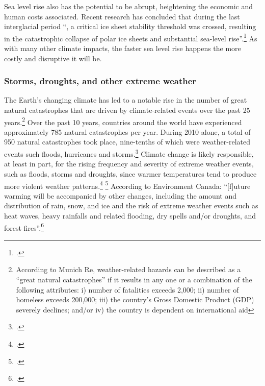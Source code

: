 \documentclass[10pt]{article}
\begin{document}
Sea level rise also has the potential to be abrupt, heightening the economic and human costs associated.
Recent research has concluded that during the last interglacial period ``, a critical ice sheet stability threshold was crossed, resulting in the catastrophic collapse of polar ice sheets and substantial sea-level rise''.\footcite[][p. 1]{OLeary2013}
As with many other climate impacts, the faster sea level rise happens the more costly and disruptive it will be.


	
	\subsubsection{Storms, droughts, and other extreme weather}



The Earth's changing climate has led to a notable rise in the number of great natural catastrophes that are driven by climate-related events over the past 25 years.\footnote{According to Munich Re, weather-related hazards can be described as a ``great natural catastrophes'' if it results in any one or a combination of the following attributes: i) number of fatalities exceeds 2,000; ii) number of homeless exceeds 200,000; iii) the country’s Gross Domestic Product (GDP) severely declines; and/or iv) the country is dependent on international aid}
Over the past 10 years, countries around the world have experienced approximately 785 natural catastrophes per year. 
During 2010 alone, a total of 950 natural catastrophes took place, nine-tenths of which were weather-related events such floods, hurricanes and storms.\footcite[][]{MunichRECatast}
Climate change is likely responsible, at least in part, for the rising frequency and severity of extreme weather events, such as floods, storms and droughts, since warmer temperatures tend to produce more violent weather patterns.\footcite[See: ][]{IPCCHurricane} \footcite[See also: ][]{Peterson2013}
According to Environment Canada: ``[f]uture warming will be accompanied by other changes, including the amount and distribution of rain, snow, and ice and the risk of extreme weather events such as heat waves, heavy rainfalls and related flooding, dry spells and/or droughts, and forest fires''.\footcite[][]{ECImpactsOfCC}
\end{document}
